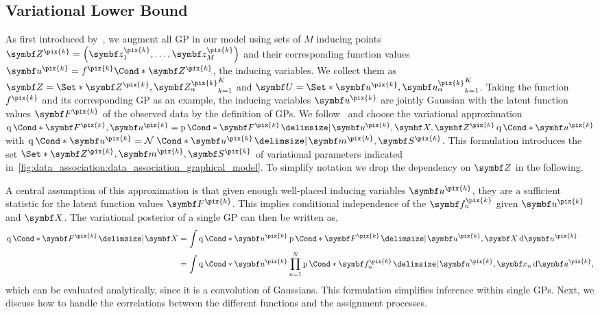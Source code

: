 \subsection{Variational Lower Bound}
\label{sub:data_association:lower_bound}
As first introduced by~\textcite{titsias_variational_2009}, we augment all GP in our model using sets of $M$ inducing points $\mat{Z^{\pix{k}}} = \left(\mat{z_1^{\pix{k}}}, \ldots, \mat{z_M^{\pix{k}}}\right)$ and their corresponding function values $\mat{u^{\pix{k}}} = \Fun*{f^{\pix{k}}}{\mat{Z^{\pix{k}}}}$, the inducing variables.
We collect them as $\mat{Z} = \Set*{\mat{Z^{\pix{k}}}, \mat{Z_\alpha^{\pix{k}}}}_{k=1}^K$ and $\mat{U} = \Set*{\mat{u^{\pix{k}}}, \mat{u_\alpha^{\pix{k}}}}_{k=1}^K$.
Taking the function $f^{\pix{k}}$ and its corresponding GP as an example, the inducing variables $\mat{u^{\pix{k}}}$ are jointly Gaussian with the latent function values $\mat{F^{\pix{k}}}$ of the observed data by the definition of GPs.
We follow~\parencite{hensman_gaussian_2013} and choose the variational approximation $\Variat*{\mat{F^{\pix{k}}}, \mat{u^{\pix{k}}}} = \Prob*{\mat{F^{\pix{k}}} \given \mat{u^{\pix{k}}}, \mat{X}, \mat{Z^{\pix{k}}}}\Variat*{\mat{u^{\pix{k}}}}$ with $\Variat*{\mat{u^{\pix{k}}}} = \Gaussian*{\mat{u^{\pix{k}}} \given \mat{m^{\pix{k}}}, \mat{S^{\pix{k}}}}$.
This formulation introduces the set $\Set*{\mat{Z^{\pix{k}}}, \mat{m^{\pix{k}}}, \mat{S^{\pix{k}}}}$ of variational parameters indicated in~\cref{fig:data_association:data_association_graphical_model}.
To simplify notation we drop the dependency on $\mat{Z}$ in the following.

A central assumption of this approximation is that given enough well-placed inducing variables $\mat{u^{\pix{k}}}$, they are a sufficient statistic for the latent function values $\mat{F^{\pix{k}}}$.
This implies conditional independence of the $\mat{f_n^{\pix{k}}}$ given $\mat{u^{\pix{k}}}$ and $\mat{X}$.
The variational posterior of a single GP can then be written as,
\begin{align}
    \begin{split}
        \Variat*{\mat{F^{\pix{k}}} \given \mat{X}}
        &=
        \int \Variat*{\mat{u^{\pix{k}}}}
        \Prob*{\mat{F^{\pix{k}}} \given \mat{u^{\pix{k}}}, \mat{X}}
        \diff \mat{u^{\pix{k}}}
        \\
        &=
        \int \Variat*{\mat{u^{\pix{k}}}}
        \prod_{n=1}^N \Prob*{\mat{f_n^{\pix{k}}} \given \mat{u^{\pix{k}}}, \mat{x_n}}
        \diff \mat{u^{\pix{k}}},
    \end{split}
\end{align}
which can be evaluated analytically, since it is a convolution of Gaussians.
This formulation simplifies inference within single GPs.
Next, we discuss how to handle the correlations between the different functions and the assignment processes.

